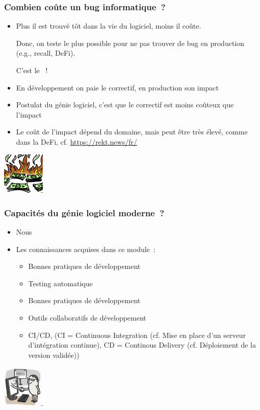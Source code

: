 \documentclass{beamer}
\begin{document}
    \begin{frame}
        \transdissolve
        \frametitle{Combien coûte un bug informatique~?}
        \begin{itemize}
            \item Plus il est trouvé tôt dans la vie du logiciel, moins il coûte.

            Donc, on teste le plus possible pour ne pas trouver de bug en production (e.g., recall, DeFi).

            C'est le ~!
            \item En développement on paie le correctif, en production son impact
            \item Postulat du génie logiciel, c'est que le correctif est moins coûteux que l'impact
            \item Le coût de l'impact dépend du domaine, mais peut être très élevé, comme dans la DeFi, cf. \url{https://rekt.news/fr/}
        \end{itemize}
        \bigbreak
        \centering
        \includegraphics[width=2cm]{image/milions-of-dolar-bills-burning.png}
    \end{frame}

    \begin{frame}
        \transdissolve
        \frametitle{Capacités du génie logiciel moderne~?}
        \begin{itemize}
            \item Nous

            \item Les connaissances acquises dans ce module~:

            \begin{itemize}
                \item Bonnes pratiques de développement
                \item Testing automatique
                \item Bonnes pratiques de développement
                \item Outils collaboratifs de développement
                \item CI/CD, (CI = Continuous Integration (cf. Mise en place d'un serveur d'intégration continue), CD = Continous Delivery (cf. Déploiement de la version validée))
            \end{itemize}
        \end{itemize}
        \bigbreak
        \centering
        \includegraphics[width=2cm]{image/programmer-shaking-hand-with-computer.png}
    \end{frame}
\end{document}
